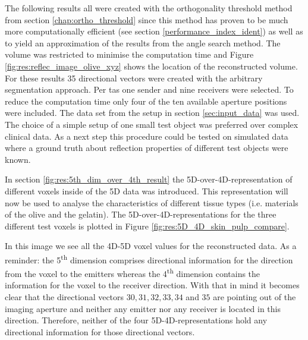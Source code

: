 The following results all were created with the orthogonality threshold method from section \ref{chap:ortho_threshold} since this method has proven to be much more computationally efficient (see section \ref{performance_index_ident}) as well as to yield an approximation of the results from the angle search method. The volume was restricted to minimise the computation time and Figure \ref{fig:res:reflec_image_olive_xyz} shows the location of the reconstructed volume. For these results 35 directional vectors were created with the arbitrary segmentation approach. Per \ac{tas} one sender and nine receivers were selected. To reduce the computation time only four of the ten available aperture positions were included. The data set from the setup in section \ref{sec:input_data} was used. The choice of a simple setup of one small test object was preferred over complex clinical data. As a next step this procedure could be tested on simulated data where a ground truth about reflection properties of different test objects were known. 



In section \ref{fig:res:5th_dim_over_4th_result} the 5D-over-4D-representation of different voxels inside of the 5D data was introduced. This representation will now be used to analyse the characteristics of different tissue types (i.e. materials of the olive and the gelatin). The 5D-over-4D-representations for the three different test voxels is plotted in Figure \ref{fig:res:5D_4D_skin_pulp_compare}. 

In this image we see all the 4D-5D voxel values for the reconstructed data. As a reminder: the 5\textsuperscript{th} dimension comprises directional information for the direction from the voxel to the emitters whereas the 4\textsuperscript{th} dimension contains the information for the voxel to the receiver direction. With that in mind it becomes clear that the directional vectors $30, 31, 32, 33, 34$ and $35$ are pointing out of the imaging aperture and neither any emitter nor any receiver is located in this direction. Therefore, neither of the four 5D-4D-representations hold any directional information for those directional vectors.

